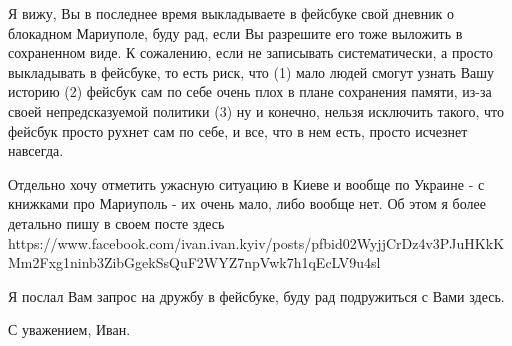 Я вижу, Вы в последнее время выкладываете в фейсбуке свой дневник о блокадном Мариуполе,
буду рад, если Вы разрешите его тоже выложить в сохраненном виде. 
К сожалению, если не записывать систематически, а просто выкладывать в фейсбуке,
то есть риск, что (1) мало людей смогут узнать Вашу историю (2) фейсбук сам по себе очень плох
в плане сохранения памяти, из-за своей непредсказуемой политики (3) ну и конечно, нельзя исключить
такого, что фейсбук просто рухнет сам по себе, и все, что в нем есть, просто исчезнет навсегда. 

Отдельно хочу отметить ужасную ситуацию в Киеве и вообще по Украине - с книжками про Мариуполь - 
их очень мало, либо вообще нет. Об этом я более детально пишу в своем посте здесь 
https://www.facebook.com/ivan.ivan.kyiv/posts/pfbid02WyjjCrDz4v3PJuHKkKMm2Fxg1ninb3ZibGgekSsQuF2WYZ7npVwk7h1qEcLV9u4sl

Я послал Вам запрос на дружбу в фейсбуке, буду рад
подружиться с Вами здесь. 

С уважением, Иван.

